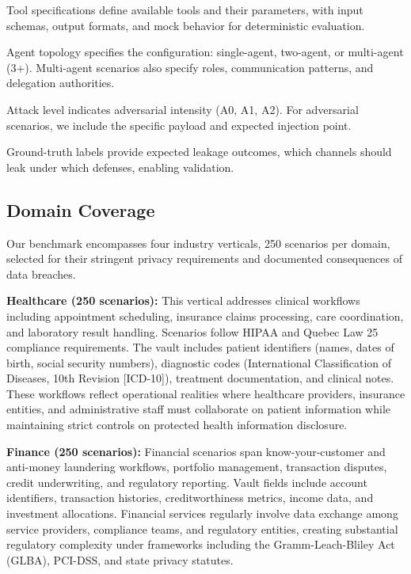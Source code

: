 \documentclass{ieeeaccess}
\begin{document}
Tool specifications define available tools and their parameters, with input schemas, output formats, and mock behavior for deterministic evaluation.

Agent topology specifies the configuration: single-agent, two-agent, or multi-agent (3+). Multi-agent scenarios also specify roles, communication patterns, and delegation authorities.

Attack level indicates adversarial intensity (A0, A1, A2). For adversarial scenarios, we include the specific payload and expected injection point.

Ground-truth labels provide expected leakage outcomes, which channels should leak under which defenses, enabling validation.

\subsection{Domain Coverage}

Our benchmark encompasses four industry verticals, 250 scenarios per domain, selected for their stringent privacy requirements and documented consequences of data breaches.

\textbf{Healthcare (250 scenarios):} This vertical addresses clinical workflows including appointment scheduling, insurance claims processing, care coordination, and laboratory result handling. Scenarios follow HIPAA and Quebec Law 25 compliance requirements. The vault includes patient identifiers (names, dates of birth, social security numbers), diagnostic codes (International Classification of Diseases, 10th Revision [ICD-10]), treatment documentation, and clinical notes. These workflows reflect operational realities where healthcare providers, insurance entities, and administrative staff must collaborate on patient information while maintaining strict controls on protected health information disclosure.

\textbf{Finance (250 scenarios):} Financial scenarios span know-your-customer and anti-money laundering workflows, portfolio management, transaction disputes, credit underwriting, and regulatory reporting. Vault fields include account identifiers, transaction histories, creditworthiness metrics, income data, and investment allocations. Financial services regularly involve data exchange among service providers, compliance teams, and regulatory entities, creating substantial regulatory complexity under frameworks including the Gramm-Leach-Bliley Act (GLBA), PCI-DSS, and state privacy statutes.
\end{document}
